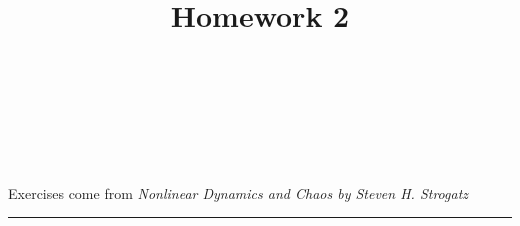 \documentclass[10pt]{amsart}
\theoremstyle{nonumberplain}
\begin{document}
\pagestyle{empty}

\newcommand{\mline}{\vspace{.2in}\hrule\vspace{.2in}}

\noindent
{} \\
 \\
 \\
 \\

\title{\bf {Homework 2} }


\maketitle
\noindent
Exercises come from \textit{Nonlinear Dynamics and Chaos by Steven H. Strogatz}
\mline
\end{document}
